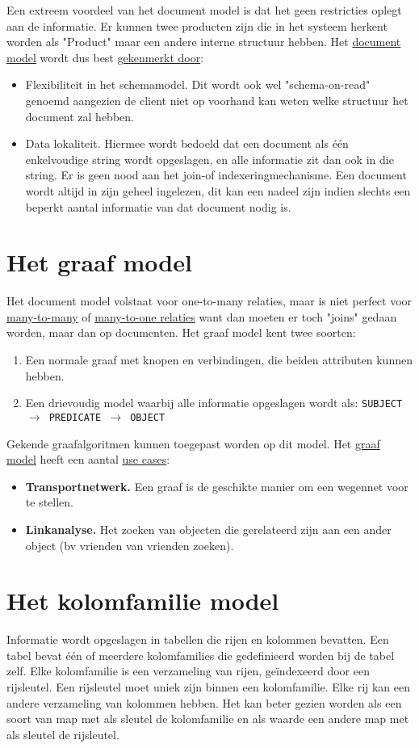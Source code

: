 	Een extreem voordeel van het document model is dat het geen restricties oplegt aan de informatie. Er kunnen twee producten zijn die in het systeem herkent worden als "Product" maar een andere interne structuur hebben. Het \underline{document model} wordt dus best \underline{gekenmerkt door}:
	\begin{itemize}
		\item Flexibiliteit in het schemamodel. Dit wordt ook wel "schema-on-read" genoemd aangezien de client niet op voorhand kan weten welke structuur het document zal hebben.
		\item Data lokaliteit. Hiermee wordt bedoeld dat een document als één enkelvoudige string wordt opgeslagen, en alle informatie zit dan ook in die string. Er is geen nood aan het join-of indexeringmechanisme. Een document wordt altijd in zijn geheel ingelezen, dit kan een nadeel zijn indien slechts een beperkt aantal informatie van dat document nodig is.
	\end{itemize}

	\section{Het graaf model}
	Het document model volstaat voor one-to-many relaties, maar is niet perfect voor \underline{many-to-many} of \underline{many-to-one relaties} want dan moeten er toch "joins" gedaan worden, maar dan op documenten. Het graaf model kent twee soorten:
	\begin{enumerate}
		\item Een normale graaf met knopen en verbindingen, die beiden attributen kunnen hebben.
		\item Een drievoudig model waarbij alle informatie opgeslagen wordt als: \texttt{SUBJECT $\rightarrow$ PREDICATE $\rightarrow$ OBJECT}
	\end{enumerate}
	Gekende graafalgoritmen kunnen toegepast worden op dit model. Het \underline{graaf model} heeft een aantal \underline{use cases}:
	\begin{itemize}
		\item \textbf{Transportnetwerk.} Een graaf is de geschikte manier om een wegennet voor te stellen.
		\item \textbf{Linkanalyse.} Het zoeken van objecten die gerelateerd zijn aan een ander object (bv vrienden van vrienden zoeken).
	\end{itemize}

	\section{Het kolomfamilie model}
	Informatie wordt opgeslagen in tabellen die rijen en kolommen bevatten. Een tabel bevat één of meerdere kolomfamilies die gedefinieerd worden bij de tabel zelf. Elke kolomfamilie is een verzameling van rijen, geïndexeerd door een rijsleutel. Een rijsleutel moet uniek zijn binnen een kolomfamilie. Elke rij kan een andere verzameling van kolommen hebben. Het kan beter gezien worden als een soort van map met als sleutel de kolomfamilie en als waarde een andere map met als sleutel de rijsleutel.
